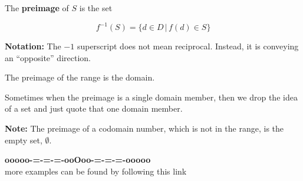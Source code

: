 \documentclass{ximera}
\begin{document}
The \textbf{preimage} of $S$ is the set

\[  f^{-1}(S) = \{ d \in D \, | \, f(d) \in S  \}    \]

\textbf{Notation:}  The $-1$ superscript does not mean reciprocal.  Instead, it is conveying an ``opposite'' direction.


The preimage of the range is the domain. 

Sometimes when the preimage is a single domain member, then we drop the idea of a set and just quote that one domain member. 


\textbf{Note:} The preimage of a codomain number, which is not in the range, is the empty set, $\emptyset$. 




















\begin{center}
\textbf{\textcolor{green!50!black}{ooooo-=-=-=-ooOoo-=-=-=-ooooo}} \\

more examples can be found by following this link\\ 

\end{center}
\end{document}
